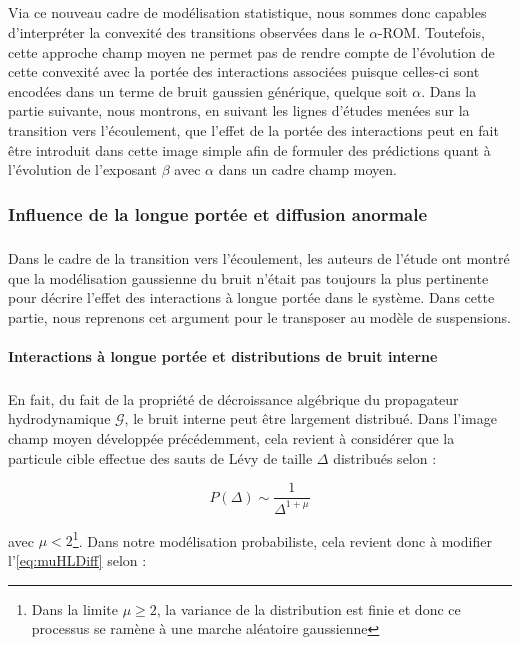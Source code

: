 \subparagraph{}Via ce nouveau cadre de modélisation statistique, nous sommes donc capables d'interpréter la convexité des transitions observées dans le $\alpha$-ROM. Toutefois, cette approche champ moyen ne permet pas de rendre compte de l'évolution de cette convexité avec la portée des interactions associées puisque celles-ci sont encodées dans un terme de bruit gaussien générique, quelque soit $\alpha$. Dans la partie suivante, nous montrons, en suivant les lignes d'études menées sur la transition vers l'écoulement, que l'effet de la portée des interactions peut en fait être introduit dans cette image simple afin de formuler des prédictions quant à l'évolution de l'exposant $\beta$ avec $\alpha$ dans un cadre champ moyen.
 
\subsubsection{Influence de la longue portée et diffusion anormale}

\label{sec:LPHL}

\subparagraph{}Dans le cadre de la transition vers l'écoulement, les auteurs de l'étude \cite{lin_mean-field_2016} ont montré que la modélisation gaussienne du bruit n'était pas toujours la plus pertinente pour décrire l'effet des interactions à longue portée dans le système. Dans cette partie, nous reprenons cet argument pour le transposer au modèle de suspensions.

\paragraph{Interactions à longue portée et distributions de bruit interne}

\subparagraph{}En fait, du fait de la propriété de décroissance algébrique du propagateur hydrodynamique $ \mathcal{G}$, le bruit interne peut être largement distribué. Dans l'image champ moyen développée précédemment, cela revient à considérer que la particule cible effectue des sauts de Lévy de taille $\Delta$ distribués selon :

\begin{equation}
	P(\Delta) \sim \frac{1}{\Delta^{1+\mu}}
\end{equation}

\noindent avec $\mu < 2$\footnote{Dans la limite $\mu \geq 2$, la variance de la distribution est finie et donc ce processus se ramène à une marche aléatoire gaussienne}. Dans notre modélisation probabiliste, cela revient donc à modifier l'\autoref{eq:muHLDiff} selon :

